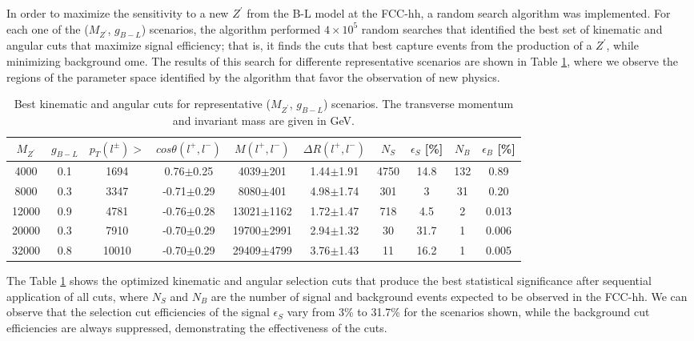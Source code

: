 \documentclass[aps,prev,twocolumn,preprintnumbers,floatfix,nofootinbib]{revtex4-1}
\begin{document}
\noindent In order to maximize the sensitivity to a new ${Z}^{\prime}$ from the B-L model at the FCC-hh, a random search algorithm was implemented. For each one of the ($M_{Z^{\prime}}$, $g_{B-L}$) scenarios, the algorithm performed $4 \times 10^5$ random searches that identified the best set of kinematic and angular cuts that maximize signal efficiency; that is, it finds the cuts that best capture events from the production of a $Z^{\prime}$, while minimizing background ome. The results of this search for differente representative scenarios are shown in Table \ref{best_cuts_representative_scenarios}, where we observe the regions of the parameter space identified by the algorithm that favor the observation of new physics. 

\begin{table}[ht]
\centering
\begin{tabular}{|c|c|c|c|c|c|c|c|c|c|}
\hline
$M_{Z^{\prime}}$ & $g_{B-L}$ & ${p}_{T}({l}^{\pm})>$ & $cos\theta({l}^{+},{l}^{-})$ & $M({l}^{+},{l}^{-})$ & $\Delta R({l}^{+},{l}^{-})$ & $N_S$ & ${\epsilon}_S$ [\%] & $N_B$ & ${\epsilon}_B$ [\%] \\ \hline
4000 & 0.1 & 1694 & 0.76$\pm$0.25 & 4039$\pm$201 & 1.44$\pm$1.91 & 4750 & 14.8 & 132 & 0.89 \\ \hline
8000 & 0.3 & 3347 & -0.71$\pm$0.29 & 8080$\pm$401 & 4.98$\pm$1.74 & 301 & 3 & 31 & 0.20 \\ \hline
12000 & 0.9 & 4781 & -0.76$\pm$0.28 & 13021$\pm$1162 & 1.72$\pm$1.47 & 718 & 4.5 & 2 & 0.013 \\ \hline
20000 & 0.3 & 7910 & -0.70$\pm$0.29 & 19700$\pm$2991 & 2.94$\pm$1.32 & 30 & 31.7 & 1 & 0.006  \\ \hline
32000 & 0.8 & 10010 & -0.70$\pm$0.29  & 29409$\pm$4799 & 3.76$\pm$1.43 & 11 & 16.2 & 1 & 0.005 \\ \hline
\end{tabular}
\caption{Best kinematic and angular cuts for representative ($M_{Z^{\prime}}$, $g_{B-L}$) scenarios. The transverse momentum and invariant mass are given in GeV.}
\label{best_cuts_representative_scenarios}
\end{table}

\noindent The Table \ref{best_cuts_representative_scenarios} shows the optimized kinematic and angular selection cuts that produce the best statistical significance after sequential application of all cuts, where $N_S$ and $N_B$ are the number of signal and background events expected to be observed in the FCC-hh. We can observe that the selection cut efficiencies of the signal ${\epsilon}_S$ vary from 3\% to 31.7\% for the scenarios shown, while the background cut efficiencies are always suppressed, demonstrating the effectiveness of the cuts.
\end{document}
